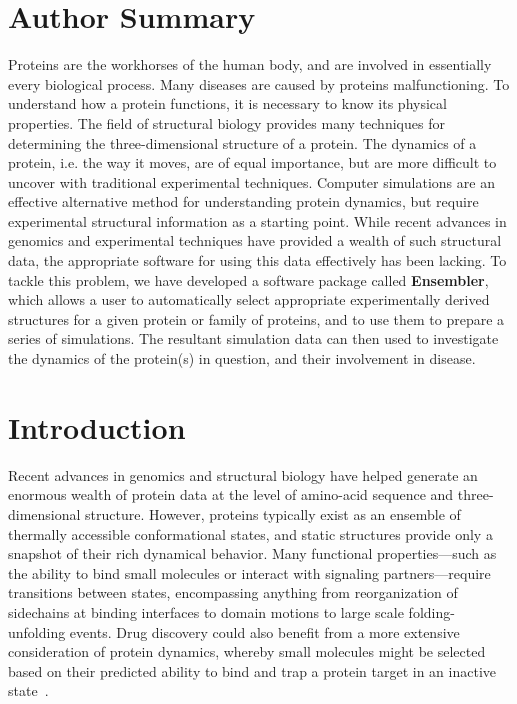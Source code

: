 \documentclass[10pt,letterpaper]{article}
\begin{document}
\section*{Author Summary}
Proteins are the workhorses of the human body, and are involved in essentially every biological process.
Many diseases are caused by proteins malfunctioning.
To understand how a protein functions, it is necessary to know its physical properties.
The field of structural biology provides many techniques for determining the three-dimensional structure of a protein.
The dynamics of a protein, i.e. the way it moves, are of equal importance, but are more difficult to uncover with traditional experimental techniques.
Computer simulations are an effective alternative method for understanding protein dynamics, but require experimental structural information as a starting point.
While recent advances in genomics and experimental techniques have provided a wealth of such structural data, the appropriate software for using this data effectively has been lacking.
To tackle this problem, we have developed a software package called {\bf Ensembler}, which allows a user to automatically select appropriate experimentally derived structures for a given protein or family of proteins, and to use them to prepare a series of simulations.
The resultant simulation data can then used to investigate the dynamics of the protein(s) in question, and their involvement in disease.

\linenumbers

\section*{Introduction}
Recent advances in genomics and structural biology have helped generate an enormous wealth of protein data at the level of amino-acid sequence and three-dimensional structure.
However, proteins typically exist as an ensemble of thermally accessible conformational states, and static structures provide only a snapshot of their rich dynamical behavior.
Many functional properties---such as the ability to bind small molecules or interact with signaling partners---require transitions between states, encompassing anything from reorganization of sidechains at binding interfaces to domain motions to large scale folding-unfolding events.
Drug discovery could also benefit from a more extensive consideration of protein dynamics, whereby small molecules might be selected based on their predicted ability to bind and trap a protein target in an inactive state~\cite{craik:science:2009:trapping-moving-targets}.
\end{document}
